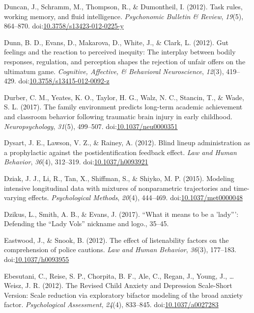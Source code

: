 \documentclass[english,man]{apa6}
\begin{document}
\hypertarget{ref-Duncan2012}{}
Duncan, J., Schramm, M., Thompson, R., \& Dumontheil, I. (2012). Task
rules, working memory, and fluid intelligence. \emph{Psychonomic
Bulletin \& Review}, \emph{19}(5), 864--870.
doi:\href{https://doi.org/10.3758/s13423-012-0225-y}{10.3758/s13423-012-0225-y}

\hypertarget{ref-Dunn2012}{}
Dunn, B. D., Evans, D., Makarova, D., White, J., \& Clark, L. (2012).
Gut feelings and the reaction to perceived inequity: The interplay
between bodily responses, regulation, and perception shapes the
rejection of unfair offers on the ultimatum game. \emph{Cognitive,
Affective, \& Behavioral Neuroscience}, \emph{12}(3), 419--429.
doi:\href{https://doi.org/10.3758/s13415-012-0092-z}{10.3758/s13415-012-0092-z}

\hypertarget{ref-Durber2017}{}
Durber, C. M., Yeates, K. O., Taylor, H. G., Walz, N. C., Stancin, T.,
\& Wade, S. L. (2017). The family environment predicts long-term
academic achievement and classroom behavior following traumatic brain
injury in early childhood. \emph{Neuropsychology}, \emph{31}(5),
499--507.
doi:\href{https://doi.org/10.1037/neu0000351}{10.1037/neu0000351}

\hypertarget{ref-Dysart2012}{}
Dysart, J. E., Lawson, V. Z., \& Rainey, A. (2012). Blind lineup
administration as a prophylactic against the postidentification feedback
effect. \emph{Law and Human Behavior}, \emph{36}(4), 312--319.
doi:\href{https://doi.org/10.1037/h0093921}{10.1037/h0093921}

\hypertarget{ref-Dziak2015}{}
Dziak, J. J., Li, R., Tan, X., Shiffman, S., \& Shiyko, M. P. (2015).
Modeling intensive longitudinal data with mixtures of nonparametric
trajectories and time-varying effects. \emph{Psychological Methods},
\emph{20}(4), 444--469.
doi:\href{https://doi.org/10.1037/met0000048}{10.1037/met0000048}

\hypertarget{ref-Dzikus2017}{}
Dzikus, L., Smith, A. B., \& Evans, J. (2017). ``What it means to be a
'lady''': Defending the ``Lady Vols'' nickname and logo., 35--45.

\hypertarget{ref-Eastwood2011}{}
Eastwood, J., \& Snook, B. (2012). The effect of listenability factors
on the comprehension of police cautions. \emph{Law and Human Behavior},
\emph{36}(3), 177--183.
doi:\href{https://doi.org/10.1037/h0093955}{10.1037/h0093955}

\hypertarget{ref-Ebesutani2012}{}
Ebesutani, C., Reise, S. P., Chorpita, B. F., Ale, C., Regan, J., Young,
J., \ldots{} Weisz, J. R. (2012). The Revised Child Anxiety and
Depression Scale-Short Version: Scale reduction via exploratory bifactor
modeling of the broad anxiety factor. \emph{Psychological Assessment},
\emph{24}(4), 833--845.
doi:\href{https://doi.org/10.1037/a0027283}{10.1037/a0027283}
\end{document}
